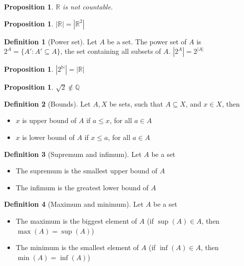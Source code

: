 \documentclass{article}
\theoremstyle{definition}
\newtheorem{definition}{Definition}[section]
\theoremstyle{definition}
\theoremstyle{plain}
\theoremstyle{plain}
\theoremstyle{plain}
\theoremstyle{plain}
\newtheorem{proposition}[theorem]{Proposition}
\theoremstyle{definition}
\theoremstyle{remark}
\theoremstyle{remark}
\theoremstyle{remark}
\theoremstyle{remark}
\newcommand{\N}{\mathbb{N}}
\newcommand{\Q}{\mathbb{Q}}
\newcommand{\R}{\mathbb{R}}
\begin{document}
\begin{proposition}
  $\R$ is not countable.
\end{proposition}



\begin{proposition}
  $|\R| = |\R^2|$
\end{proposition}


\begin{definition}[Power set]
  Let $A$ be a set. The power set of $A$ is $2^A = \{ A' : A' \subseteq A \}$, the set containing all subsets of $A$. $|2^A| = 2^{|A|}$
\end{definition}


\begin{proposition}
  $|2^{\N}| = |\R|$
\end{proposition}


\begin{proposition}
  $\sqrt{2} \notin \Q$
\end{proposition}



\begin{definition}[Bounds]
  Let $A, X$ be sets, such that $A \subseteq X$, and $x \in X$, then
  \begin{itemize}
  \item $x$ is upper bound of $A$ if $a \leq x$, for all $a \in A$
  \item $x$ is lower bound of $A$ if $x \leq a$, for all $a \in A$
  \end{itemize}
\end{definition}


\begin{definition}[Supremum and infimum]
  Let $A$ be a set
  \begin{itemize}
  \item The supremum is the smallest upper bound of $A$
  \item The infimum is the greatest lower bound of $A$
  \end{itemize}
\end{definition}


\begin{definition}[Maximum and minimum]
  Let $A$ be a set
  \begin{itemize}
  \item The maximum is the biggest element of $A$ (if $\sup(A) \in A$, then $\max(A) = \sup(A)$)
  \item The minimum is the smallest element of $A$ (if $\inf(A) \in A$, then $\min(A) = \inf(A)$)
  \end{itemize}
\end{definition}
\end{document}
